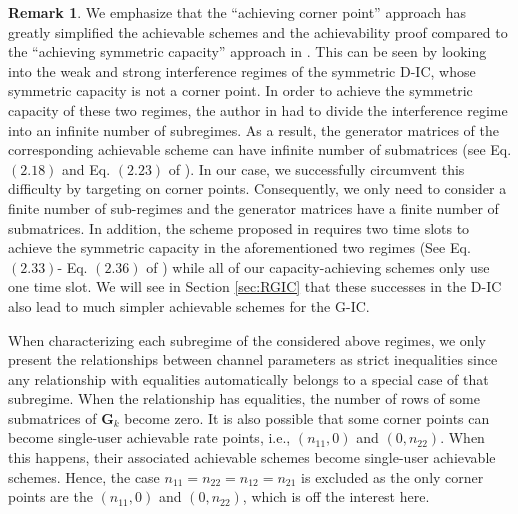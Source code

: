 \documentclass[12pt, draftclsnofoot, onecolumn]{IEEEtran}
\theoremstyle{definition}
\newtheorem{remark}{Remark}
\begin{document}
\begin{remark}\label{remark2}
We emphasize that the ``achieving corner point'' approach has greatly simplified the achievable schemes and the achievability proof compared to the ``achieving symmetric capacity'' approach in \cite{ShuoLithesis}. This can be seen by looking into the weak and strong interference regimes of the symmetric D-IC, whose symmetric capacity is not a corner point. In order to achieve the symmetric capacity of these two regimes, the author in \cite{ShuoLithesis} had to divide the interference regime into an infinite number of subregimes. As a result, the generator matrices of the corresponding achievable scheme can have infinite number of submatrices (see Eq. $(2.18)$ and Eq. $(2.23)$ of \cite{ShuoLithesis}). In our case, we successfully circumvent this difficulty by targeting on corner points. Consequently, we only need to consider a finite number of sub-regimes and the generator matrices have a finite number of submatrices. In addition, the scheme proposed in \cite{ShuoLithesis} requires two time slots to achieve the symmetric capacity in the aforementioned two regimes (See Eq. $(2.33)$- Eq. $(2.36)$ of \cite{ShuoLithesis}) while all of our capacity-achieving schemes only use one time slot. We will see in Section \ref{sec:RGIC} that these successes in the D-IC also lead to much simpler achievable schemes for the G-IC.
\end{remark}




When characterizing each subregime of the considered above regimes, we only present the relationships between channel parameters as strict inequalities since any relationship with equalities automatically belongs to a special case of that subregime. When the relationship has equalities, the number of rows of some submatrices of $\boldsymbol{G}_k$ become zero. It is also possible that some corner points can become single-user achievable rate points, i.e., $(n_{11},0)$ and $(0,n_{22})$. When this happens, their associated achievable schemes become single-user achievable schemes. Hence, the case $n_{11}=n_{22}=n_{12}=n_{21}$ is excluded as the only corner points are the $(n_{11},0)$ and $(0,n_{22})$, which is off the interest here.











\end{document}
